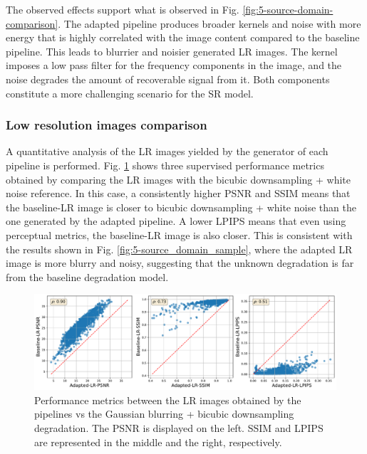         

        The observed effects support what is observed in Fig. \ref{fig:5-source-domain-comparison}. 
        The adapted pipeline produces broader kernels and noise with more energy that is highly correlated with the image content compared to the baseline pipeline.
        This leads to blurrier and noisier generated LR images. 
        The kernel imposes a low pass filter for the frequency components in the image, and the noise degrades the amount of recoverable signal from it.
        Both components constitute a more challenging scenario for the SR model. 

        \subsubsection{Low resolution images comparison} \label{subsec:results-lr-comparison}

        A quantitative analysis of the LR images yielded by the generator of each pipeline is performed. 
        Fig. \ref{fig:5-source-domain-lr-performance-scatterplot} shows three supervised performance metrics obtained by comparing the LR images with the bicubic downsampling + white noise reference.
        In this case, a consistently higher PSNR and SSIM means that the baseline-LR image is closer to bicubic downsampling + white noise than the one generated by the adapted pipeline. 
        A lower LPIPS means that even using perceptual metrics, the baseline-LR image is also closer.
        This is consistent with the results shown in Fig. \ref{fig:5-source_domain_sample}, where the adapted LR image is more blurry and noisy, suggesting that the unknown degradation is far from the baseline degradation model.
        
        \begin{figure}[H]
            \centering
            \includegraphics[width=\textwidth]{Includes/5-source-domain-lr-performance-scatterplot.pdf}
            \caption{Performance metrics between the LR images obtained by the pipelines vs the Gaussian blurring + bicubic downsampling degradation.
                     The PSNR is displayed on the left. SSIM and LPIPS are represented in the middle and the right, respectively.}
            \label{fig:5-source-domain-lr-performance-scatterplot}
        \end{figure}




